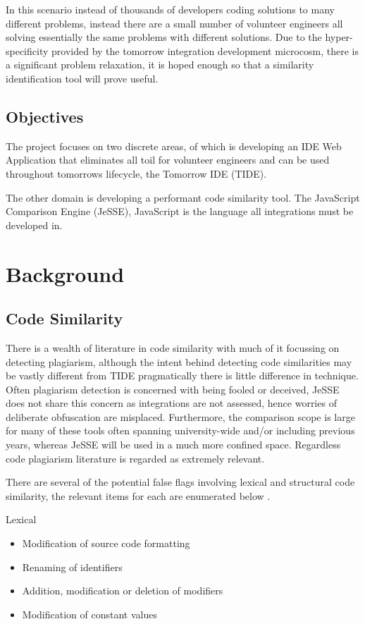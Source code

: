 \documentclass[jou,apacite]{apa6}
\begin{document}
In this scenario instead of thousands of developers coding solutions to many different problems, instead there are a small number of volunteer engineers all solving essentially the same problems with different solutions. Due to the hyper-specificity provided by the tomorrow integration development microcosm, there is a significant problem relaxation, it is hoped enough so that a similarity identification tool will prove useful.

\subsection{Objectives}
The project focuses on two discrete areas, 
 of which is developing an IDE Web Application that eliminates all toil for volunteer engineers and can be used throughout tomorrow\textquotesingle s lifecycle, the Tomorrow IDE (TIDE).

The other domain is developing a performant code similarity tool. The JavaScript Comparison Engine (JeSSE), JavaScript is the language all integrations must be developed in.

\section{Background}
\subsection{Code Similarity}
There is a wealth of literature in code similarity with much of it focussing on detecting plagiarism, although the intent behind detecting code similarities may be vastly different from TIDE pragmatically there is little difference in technique. Often plagiarism detection is concerned with being fooled or deceived, JeSSE does not share this concern as integrations are not assessed,  hence worries of deliberate obfuscation are misplaced. Furthermore, the comparison scope is large for many of these tools often spanning university-wide and/or including previous years, whereas JeSSE will be used in a much more confined space. Regardless code plagiarism literature is regarded as extremely relevant.

There are several of the potential false flags involving lexical and structural code similarity, the relevant items for each are enumerated below \cite{Duric2013}.

Lexical
\begin{itemize}
  \setlength\itemsep{-0.5em}
  \item Modification of source code formatting 
  \item Renaming of identifiers
  \item Addition, modification or deletion of modifiers
  \item Modification of constant values
\end{itemize}
\end{document}
